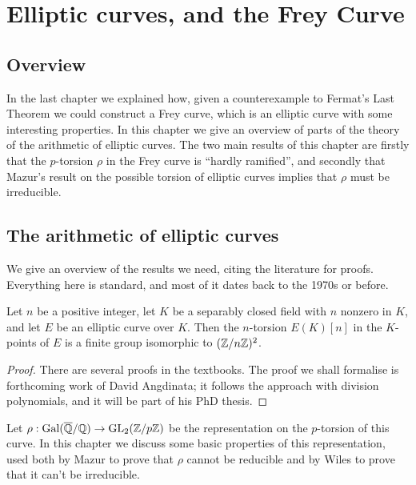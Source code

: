 \chapter{Elliptic curves, and the Frey Curve}

\section{Overview}

In the last chapter we explained how, given a counterexample to Fermat's Last Theorem we could construct a Frey curve, which is an elliptic curve with some interesting properties. In this chapter we give an overview of parts of the theory of the arithmetic of elliptic curves. The two main results of this chapter are firstly that the $p$-torsion $\rho$ in the Frey curve is ``hardly ramified'', and secondly that Mazur's result on the possible torsion of elliptic curves implies that $\rho$ must be irreducible. 

\section{The arithmetic of elliptic curves}

We give an overview of the results we need, citing the literature for proofs. Everything here is standard, and most
of it dates back to the 1970s or before.

\begin{theorem}\label{Elliptic_curve_p_torsion_2d} Let $n$ be a positive integer, let $K$ be a separably closed
  field with $n$ nonzero in $K$, and let $E$ be an elliptic curve over $K$. Then the $n$-torsion $E(K)[n]$ 
  in the $K$-points of $E$ is a finite group isomorphic to $(\mathbb{Z}/n\mathbb{Z})^2$.
\end{theorem}
\begin{proof}
  There are several proofs in the textbooks. The proof we shall formalise is forthcoming work of David Angdinata; it follows the approach with division polynomials, and it will be part of his PhD thesis.
\end{proof}






Let $\rho:\operatorname{Gal}(\overline{\mathbb{Q}}/\mathbb{Q})\to\operatorname{GL}_2(\mathbb{Z}/p\mathbb{Z})$ be the representation on the $p$-torsion of this curve. In this chapter we discuss some basic properties of this representation, used both by Mazur to prove that $\rho$ cannot be reducible and by Wiles to prove that it can't be irreducible.

